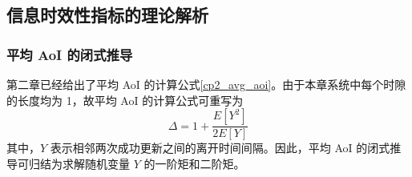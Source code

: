 \subsection{信息时效性指标的理论解析}
\subsubsection{平均 AoI 的闭式推导}

第二章已经给出了平均 AoI 的计算公式\eqref{cp2_avg_aoi}。由于本章系统中每个时隙的长度均为 1，故平均 AoI 的计算公式可重写为
\begin{equation}\label{cp3_avg_aoi}
    \Delta = 1 + \frac{E[Y^2]}{2E[Y]}
\end{equation}
其中，$Y$ 表示相邻两次成功更新之间的离开时间间隔。因此，平均 AoI 的闭式推导可归结为求解随机变量 $Y$ 的一阶矩和二阶矩。

